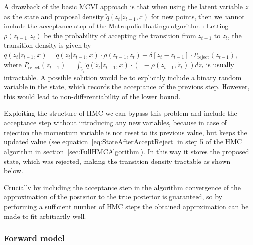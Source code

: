 A drawback of the basic MCVI approach is that when using the latent variable $z$ as the state and proposal density $\tilde{q}(z_t|z_{t-1}, x)$ for new points, then we cannot include the acceptance step of the Metropolis-Hastings algorithm \parencite{Salimans2014}: Letting $\rho(z_{t-1}, z_t)$ be the probability of accepting the transition from $z_{t-1}$ to $z_t$, the transition density is given by $q(z_t|z_{t-1}, x) = \tilde{q}(z_t|z_{t-1}, x) \cdot \rho(z_{t-1}, z_t) + \delta[z_t - z_{t-1}] \cdot P_\textrm{reject}(z_{t-1})$, where $P_\textrm{reject}(z_{t-1}) = \int_{\tilde{z}_{t}} \tilde{q}(\tilde{z}_t|z_{t-1}, x) \cdot (1 - \rho(z_{t-1}, \tilde{z}_t)) d\tilde{z}_t$ is usually intractable. A possible solution would be to explicitly include a binary random variable in the state, which records the acceptance of the previous step. However, this would lead to non-differentiability of the lower bound.

Exploiting the structure of HMC we can bypass this problem and include the acceptance step without introducing any new variables, because in case of rejection the momentum variable is not reset to its previous value, but keeps the updated value (see equation~\eqref{eq:StateAfterAcceptReject} in step 5 of the HMC algorithm in section~\ref{sec:FullHMCAlgorithm}). In this way it stores the proposed state, which was rejected, making the transition density tractable as shown below.

Crucially by including the acceptance step in the algorithm convergence of the approximation of the posterior to the true posterior is guaranteed, so by performing a sufficient number of HMC steps the obtained approximation can be made to fit arbitrarily well.

\subsubsection{Forward model}

